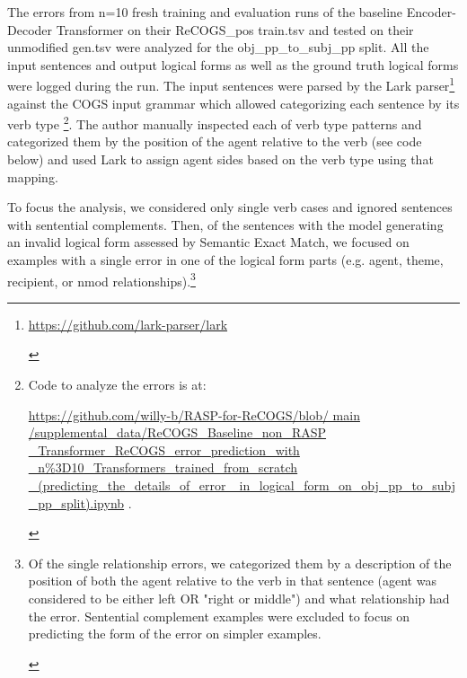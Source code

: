 \documentclass[11pt]{article}
\begin{document}
The errors from n=10 fresh training and evaluation runs of the baseline \citep{Wu2023} Encoder-Decoder Transformer on their ReCOGS\_pos train.tsv and tested on their unmodified gen.tsv were analyzed for the obj\_pp\_to\_subj\_pp split. All the input sentences and output logical forms as well as the ground truth logical forms were logged during the run. The input sentences were parsed by the Lark parser\footnote{\begin{footnotesize}\href{https://github.com/lark-parser/lark}{https://github.com/lark-parser/lark}\end{footnotesize}} against the COGS input grammar which allowed categorizing each sentence by its verb type \footnote{\begin{footnotesize}Code to analyze the errors is at: 

\href{https://github.com/willy-b/RASP-for-ReCOGS/blob/main/supplemental\_data/ReCOGS\_Baseline\_non\_RASP\_Transformer\_ReCOGS\_error\_prediction\_with\_n\%3D10\_Transformers\_trained\_from\_scratch\_(predicting\_the\_details\_of\_error\_in\_logical\_form\_on\_obj\_pp\_to\_subj\_pp\_split).ipynb}{https://github.com/willy-b/RASP-for-ReCOGS/blob/
main
/supplemental\_data/ReCOGS\_Baseline\_non\_RASP
\_Transformer\_ReCOGS\_error\_prediction\_with
\_n\%3D10\_Transformers\_trained\_from\_scratch
\_(predicting\_the\_details\_of\_error
\_in\_logical\_form\_on\_obj\_pp\_to\_subj
\_pp\_split).ipynb} .\end{footnotesize}}. The author manually inspected each of verb type patterns and categorized them by the position of the agent relative to the verb (see code below) and used Lark to assign agent sides based on the verb type using that mapping.

To focus the analysis, we considered only single verb cases and ignored sentences with sentential complements. Then, of the sentences with the model generating an invalid logical form assessed by Semantic Exact Match, we focused on examples with a single error in one of the logical form parts (e.g. agent, theme, recipient, or nmod relationships).\footnote{\begin{footnotesize}Of the single relationship errors, we categorized them by a description of the position of both the agent relative to the verb in that sentence (agent was considered to be either left OR "right or middle") and what relationship had the error. Sentential complement examples were excluded to focus on predicting the form of the error on simpler examples.\end{footnotesize}}
\end{document}
